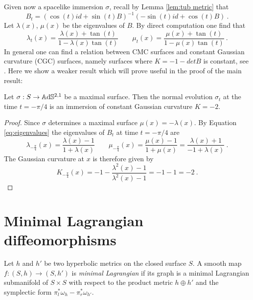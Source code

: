 Given now a spacelike immersion $\sigma$, recall by Lemma \ref{lem:tub metric} that
\[
    B_t = (\cos(t) id + \sin(t) B)^{-1}(-\sin(t) id + \cos(t) B) \ .
\]
Let $\lambda(x)$, $\mu(x)$ be the eigenvalues of $B$. By direct computation one find that
\begin{equation} \label{eq:eigenvalues}
    \lambda_t(x) = \frac{\lambda(x)+\tan(t)}{1- \lambda(x)\tan(t)} \qquad \mu_t(x) = \frac{\mu(x)+\tan(t)}{1- \mu(x)\tan(t)} \ .
\end{equation}
In general one can find a relation between CMC surfaces and constant Gaussian curvature (CGC) surfaces, namely surfaces where $K = -1 - detB$ is constant, see \cite{chen2017constantmeancurvaturefoliation}. Here we show a weaker result which will prove useful in the proof of the main result:
\begin{proposition} \label{prop:cmc to cgc}
    Let $\sigma: S \to\mathbb{A}\mathrm{d}\mathbb{S}^{2,1}$ be a maximal surface. Then the normal evolution $\sigma_{t}$ at the time $t= -\pi / 4$ is an immersion of constant Gaussian curvature $K = -2$.
\end{proposition}
\begin{proof}
    Since $\sigma$ determines a maximal surface $\mu(x) = - \lambda(x)$. By Equation \ref{eq:eigenvalues} the eigenvalues of $B_t$ at time $t=-\pi / 4$ are
    \[
        \lambda_{-\frac{\pi}{4}}(x) = \frac{\lambda(x) -1}{1 +\lambda(x)} \qquad \mu_{-\frac{\pi}{4}}(x) = \frac{\mu(x)-1}{1 + \mu(x)} = \frac{\lambda(x) + 1}{-1 + \lambda(x)} \ .
    \]
    The Gaussian curvature at $x$ is therefore given by
    \[
        K_{-\frac{\pi}{4}}(x) = - 1 - \frac{ \lambda^2(x) -1}{ \lambda^2(x) -1 } = -1 -1 = -2 \ .
    \]
\end{proof}

\section{Minimal Lagrangian diffeomorphisms}

\begin{definition}
    Let $h$ and $h'$ be two hyperbolic metrics on the closed surface $S$. A smooth map $f: (S,h) \to (S,h')$ is \textit{minimal Lagrangian} if its graph is a minimal Lagrangian submanifold of $S\times S$ with respect to the product metric $h \oplus h'$ and the symplectic form $\pi_l^*\omega_h - \pi_r^* \omega_{h'}$. 
\end{definition}

